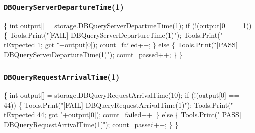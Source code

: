 \documentclass{article}
\def\nwendcode{\endtrivlist \endgroup}
\let\nwdocspar=\par
\begin{document}
\subsubsection{{\tt{}DBQueryServerDepartureTime}(1)}
\nwenddocs{}\endmoddef{}
\{
  int output[] = storage.DBQueryServerDepartureTime(1);
  if (!(output[0] == 1)) \{
    Tools.Print("[FAIL] DBQueryServerDepartureTime(1)");
    Tools.Print("\\tExpected 1; got "+output[0]);
    count_failed++;
  \} else \{
    Tools.Print("[PASS] DBQueryServerDepartureTime(1)");
    count_passed++;
  \}
\}
\nwendcode{}\nwdocspar
\subsubsection{{\tt{}DBQueryRequestArrivalTime}(1)}
\nwenddocs{}\endmoddef{}
\{
  int output[] = storage.DBQueryRequestArrivalTime(10);
  if (!(output[0] == 44)) \{
    Tools.Print("[FAIL] DBQueryRequestArrivalTime(1)");
    Tools.Print("\\tExpected 44; got "+output[0]);
    count_failed++;
  \} else \{
    Tools.Print("[PASS] DBQueryRequestArrivalTime(1)");
    count_passed++;
  \}
\}
\nwendcode{}\nwdocspar
\end{document}
